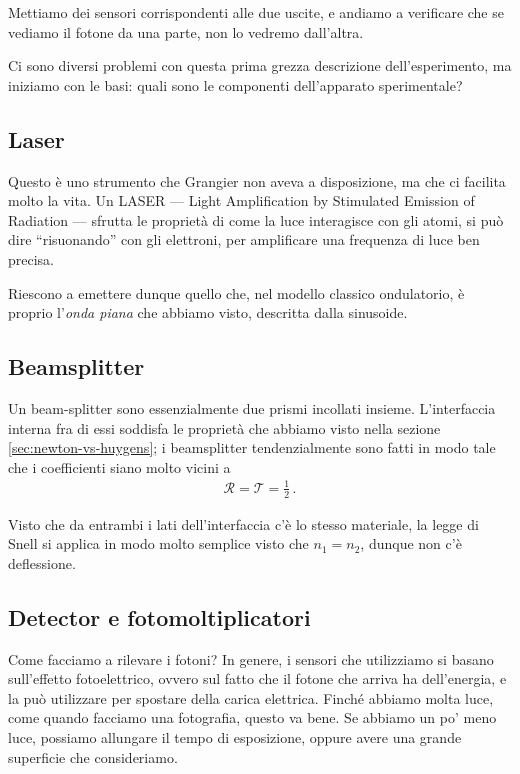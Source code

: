 \documentclass{article}
\begin{document}
Mettiamo dei sensori corrispondenti alle due uscite, e andiamo a verificare che se vediamo il fotone da una parte, non lo vedremo dall'altra.

Ci sono diversi problemi con questa prima grezza descrizione dell'esperimento, ma iniziamo con le basi: quali sono le componenti dell'apparato sperimentale?

\subsection{Laser}

Questo è uno strumento che Grangier non aveva a disposizione, ma che ci facilita molto la vita. 
Un LASER --- Light Amplification by Stimulated Emission of Radiation --- sfrutta le proprietà di come la luce interagisce con gli atomi, si può dire ``risuonando'' con gli elettroni, per amplificare una frequenza di luce ben precisa.

Riescono a emettere dunque quello che, nel modello classico ondulatorio, è proprio l'\emph{onda piana} che abbiamo visto, descritta dalla sinusoide.

\subsection{Beamsplitter}

Un beam-splitter sono essenzialmente due prismi incollati insieme.
L'interfaccia interna fra di essi soddisfa le proprietà che abbiamo visto nella sezione \ref{sec:newton-vs-huygens}; i beamsplitter tendenzialmente sono fatti in modo tale che i coefficienti siano molto vicini a 
%
\begin{align}
\mathcal{R} = \mathcal{T} = \frac{1}{2}
\,.
\end{align}

Visto che da entrambi i lati dell'interfaccia c'è lo stesso materiale, la legge di Snell si applica in modo molto semplice visto che \(n_1 = n_2 \), dunque non c'è deflessione.

\subsection{Detector e fotomoltiplicatori}

Come facciamo a rilevare i fotoni? 
In genere, i sensori che utilizziamo si basano sull'effetto fotoelettrico, ovvero sul fatto che il fotone che arriva ha dell'energia, e la può utilizzare per spostare della carica elettrica.
Finché abbiamo molta luce, come quando facciamo una fotografia, questo va bene. Se abbiamo un po' meno luce, possiamo allungare il tempo di esposizione, oppure avere una grande superficie che consideriamo.
\end{document}
